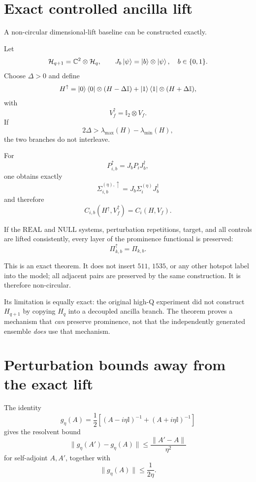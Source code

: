 \documentclass[11pt,a4paper]{article}
\newcommand{\Real}{\mathrm{REAL}}
\newcommand{\Null}{\mathrm{NULL}}
\newcommand{\cH}{\mathcal H}
\newcommand{\Id}{\mathbb I}
\newcommand{\Prom}{\Pi}
\begin{document}
\section{Exact controlled ancilla lift}

A non-circular dimensional-lift baseline can be constructed exactly.

Let
\[
\cH_{q+1}=\mathbb C^2\otimes\cH_q,
\qquad
J_b\ket{\psi}
=
\ket{b}\otimes\ket{\psi},
\quad b\in\{0,1\}.
\]
Choose \(\Delta>0\) and define
\[
H^\uparrow
=
\ket0\bra0\otimes(H-\Delta\Id)
+
\ket1\bra1\otimes(H+\Delta\Id),
\]
with
\[
V_f^\uparrow=\Id_2\otimes V_f.
\]
If
\[
2\Delta>
\lambda_{\max}(H)-\lambda_{\min}(H),
\]
the two branches do not interleave.

For
\[
P_{i,b}^\uparrow=J_bP_iJ_b^\dagger,
\]
one obtains exactly
\[
\boxed{
\Sigma_{i,b}^{(\eta),\uparrow}
=
J_b\Sigma_i^{(\eta)}J_b^\dagger
}
\]
and therefore
\[
\boxed{
C_{i,b}(H^\uparrow,V_f^\uparrow)
=
C_i(H,V_f).
}
\]

If the \(\Real\) and \(\Null\) systems, perturbation repetitions, target, and
all controls are lifted consistently, every layer of the prominence
functional is preserved:
\[
\boxed{
\Prom_{k,b}^{\uparrow}
=
\Prom_{k,b}.
}
\]

This is an exact theorem.  It does not insert \(511\), \(1535\), or any other
hotspot label into the model; all adjacent pairs are preserved by the same
construction.  It is therefore non-circular.

Its limitation is equally exact: the original high-Q experiment did not
construct \(H_{q+1}\) by copying \(H_q\) into a decoupled ancilla branch.
The theorem proves a mechanism that \emph{can} preserve prominence, not that
the independently generated ensemble \emph{does} use that mechanism.

\section{Perturbation bounds away from the exact lift}

The identity
\[
g_\eta(A)
=
\frac12
\left[
(A-i\eta\Id)^{-1}
+
(A+i\eta\Id)^{-1}
\right]
\]
gives the resolvent bound
\[
\boxed{
\|g_\eta(A')-g_\eta(A)\|
\le
\frac{\|A'-A\|}{\eta^2}
}
\]
for self-adjoint \(A,A'\), together with
\[
\|g_\eta(A)\|\le\frac{1}{2\eta}.
\]
\end{document}
